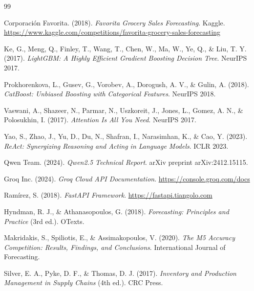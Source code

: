 \documentclass[12pt,a4paper]{report}
\begin{document}
\vspace{0.8cm}

\cleardoublepage

\begin{thebibliography}{99}

Corporación Favorita. (2018). \textit{Favorita Grocery Sales Forecasting}. Kaggle. \url{https://www.kaggle.com/competitions/favorita-grocery-sales-forecasting}

Ke, G., Meng, Q., Finley, T., Wang, T., Chen, W., Ma, W., Ye, Q., \& Liu, T. Y. (2017). \textit{LightGBM: A Highly Efficient Gradient Boosting Decision Tree}. NeurIPS 2017.

Prokhorenkova, L., Gusev, G., Vorobev, A., Dorogush, A. V., \& Gulin, A. (2018). \textit{CatBoost: Unbiased Boosting with Categorical Features}. NeurIPS 2018.

Vaswani, A., Shazeer, N., Parmar, N., Uszkoreit, J., Jones, L., Gomez, A. N., \& Polosukhin, I. (2017). \textit{Attention Is All You Need}. NeurIPS 2017.

Yao, S., Zhao, J., Yu, D., Du, N., Shafran, I., Narasimhan, K., \& Cao, Y. (2023). \textit{ReAct: Synergizing Reasoning and Acting in Language Models}. ICLR 2023.

Qwen Team. (2024). \textit{Qwen2.5 Technical Report}. arXiv preprint arXiv:2412.15115.

Groq Inc. (2024). \textit{Groq Cloud API Documentation}. \url{https://console.groq.com/docs}

Ramírez, S. (2018). \textit{FastAPI Framework}. \url{https://fastapi.tiangolo.com}

Hyndman, R. J., \& Athanasopoulos, G. (2018). \textit{Forecasting: Principles and Practice} (3rd ed.). OTexts.

Makridakis, S., Spiliotis, E., \& Assimakopoulos, V. (2020). \textit{The M5 Accuracy Competition: Results, Findings, and Conclusions}. International Journal of Forecasting.

Silver, E. A., Pyke, D. F., \& Thomas, D. J. (2017). \textit{Inventory and Production Management in Supply Chains} (4th ed.). CRC Press.


\end{thebibliography}
\end{document}
